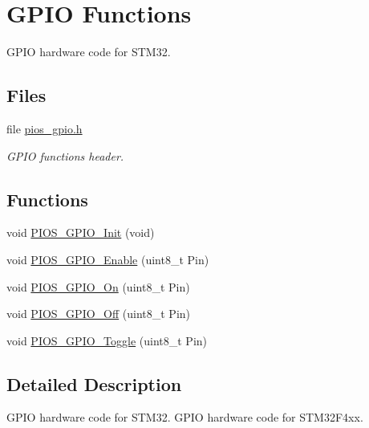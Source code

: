 \hypertarget{group___p_i_o_s___g_p_i_o}{\section{\-G\-P\-I\-O \-Functions}
\label{group___p_i_o_s___g_p_i_o}
}


\-G\-P\-I\-O hardware code for \-S\-T\-M32.  


\subsection*{\-Files}
\begin{DoxyCompactItemize}
\item 
file \hyperlink{pios__gpio_8h}{pios\-\_\-gpio.\-h}
\begin{DoxyCompactList}\small\item\em \-G\-P\-I\-O functions header. \end{DoxyCompactList}\end{DoxyCompactItemize}
\subsection*{\-Functions}
\begin{DoxyCompactItemize}
\item 
void \hyperlink{group___p_i_o_s___g_p_i_o_ga0a04c19c7662b5b1bab7af58cc95ea71}{\-P\-I\-O\-S\-\_\-\-G\-P\-I\-O\-\_\-\-Init} (void)
\item 
void \hyperlink{group___p_i_o_s___g_p_i_o_ga1ea220ce8e0a9081fc1d33e11062305e}{\-P\-I\-O\-S\-\_\-\-G\-P\-I\-O\-\_\-\-Enable} (uint8\-\_\-t \-Pin)
\item 
void \hyperlink{group___p_i_o_s___g_p_i_o_ga289b80b649d2822e23e75e50f08aacff}{\-P\-I\-O\-S\-\_\-\-G\-P\-I\-O\-\_\-\-On} (uint8\-\_\-t \-Pin)
\item 
void \hyperlink{group___p_i_o_s___g_p_i_o_ga6c44e966e9da101b26f64778d517787a}{\-P\-I\-O\-S\-\_\-\-G\-P\-I\-O\-\_\-\-Off} (uint8\-\_\-t \-Pin)
\item 
void \hyperlink{group___p_i_o_s___g_p_i_o_gadf86d97ffad85f2bfb36da79c7d84145}{\-P\-I\-O\-S\-\_\-\-G\-P\-I\-O\-\_\-\-Toggle} (uint8\-\_\-t \-Pin)
\end{DoxyCompactItemize}


\subsection{\-Detailed \-Description}
\-G\-P\-I\-O hardware code for \-S\-T\-M32. \-G\-P\-I\-O hardware code for \-S\-T\-M32\-F4xx. 

